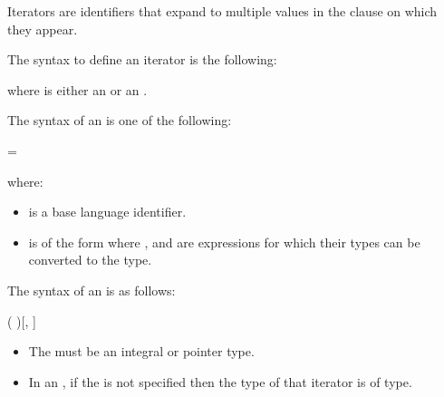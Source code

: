 Iterators are identifiers that expand to multiple values in the clause on which they appear.

The syntax to define an iterator is the following:
\begin{ompSyntax}
\end{ompSyntax}
where  is either an  or an .

The syntax of an  is one of the following:
\begin{indentedcodelist}
  = 
\end{indentedcodelist}

where:
\begin{itemize}
\item {} is a base language identifier.

\item {} is of the form  where ,  and  are expressions for which their types can be converted to the  type.
\end{itemize}

The syntax of an  is as follows:
\begin{indentedcodelist}
(  )[, ]
\end{indentedcodelist}


\begin{ccppspecific}
\begin{itemize}
\item The  must be an integral or pointer type.
\item In an , if the  is not specified then the type of that iterator is of  type.
\end{itemize}
\end{ccppspecific}

